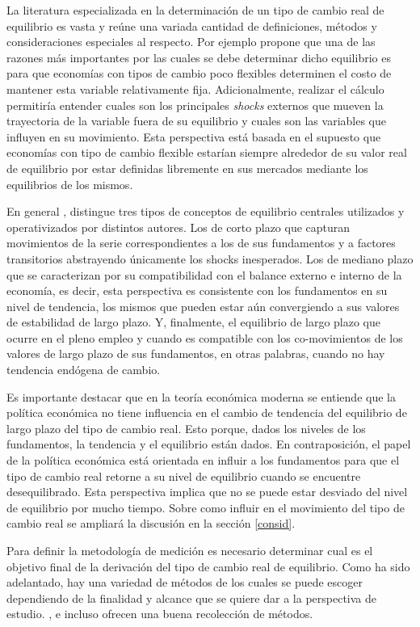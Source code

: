 \documentclass[12pt,letterpaper]{article}
\begin{document}
La literatura especializada en la determinación de un tipo de cambio real de equilibrio es vasta y reúne una variada cantidad de definiciones, métodos y consideraciones especiales al respecto. Por ejemplo \cite{driver2005concepts} propone que una de las razones más importantes por las cuales se debe determinar dicho equilibrio es para que economías con tipos de cambio poco flexibles determinen el costo de mantener esta variable relativamente fija. Adicionalmente, realizar el cálculo permitiría entender cuales son los principales \emph{shocks} externos que mueven la trayectoria de la variable fuera de su equilibrio y cuales son las variables que influyen en su movimiento. Esta perspectiva está basada en el supuesto que economías con tipo de cambio flexible estarían siempre alrededor de su valor real de equilibrio por estar definidas libremente en sus mercados mediante los equilibrios de los mismos.

En general \cite{driver2005concepts}, distingue tres tipos de conceptos de equilibrio centrales utilizados y operativizados por distintos autores. Los de corto plazo que capturan movimientos de la serie correspondientes a los de sus fundamentos y a factores transitorios abstrayendo únicamente los shocks inesperados. Los de mediano plazo que se caracterizan por su compatibilidad con el balance externo e interno de la economía, es decir, esta perspectiva es consistente con los fundamentos en su nivel de tendencia, los mismos que pueden estar aún convergiendo a sus valores de estabilidad de largo plazo. Y, finalmente, el equilibrio de largo plazo que ocurre en el pleno empleo y cuando es compatible con los co-movimientos de los valores de largo plazo de sus fundamentos, en otras palabras, cuando no hay tendencia endógena de cambio.

Es importante destacar que en la teoría económica moderna se entiende que la política económica no tiene influencia en el cambio de tendencia del equilibrio de largo plazo del tipo de cambio real. Esto porque, dados los niveles de los fundamentos, la tendencia y el equilibrio están dados. En contraposición, el papel de la política económica está orientada en influir a los fundamentos para que el tipo de cambio real retorne a su nivel de equilibrio cuando se encuentre desequilibrado. Esta perspectiva implica que no se puede estar desviado del nivel de equilibrio por mucho tiempo. Sobre como influir en el movimiento del tipo de cambio real se ampliará la discusión en la sección \ref{consid}.

Para definir la metodología de medición es necesario determinar cual es el objetivo final de la derivación del tipo de cambio real de equilibrio. Como ha sido adelantado, hay una variedad de métodos de los cuales se puede escoger dependiendo de la finalidad y alcance que se quiere dar a la perspectiva de estudio. \cite{driver2005concepts}, \cite{macdonald2000concepts} e incluso \cite{akrama2003real} ofrecen una buena recolección de métodos.
\end{document}
